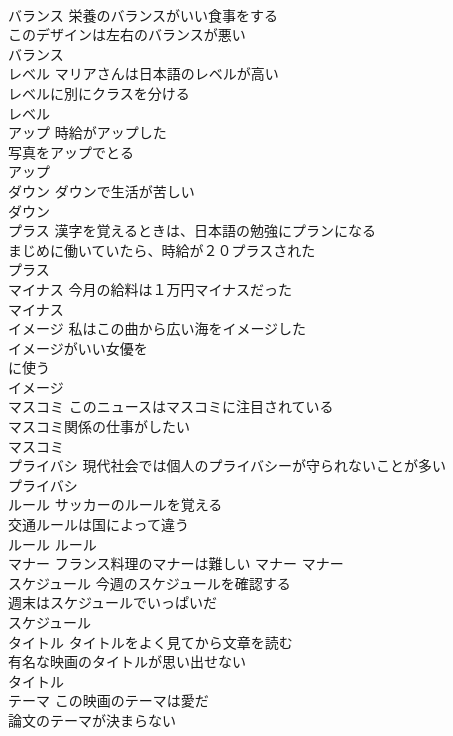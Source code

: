 \documentclass[8pt]{extreport}
\begin{document}
\begin{CJK}{UTF8}{min}
\\	バランス	栄養のバランスがいい食事をする 
\\	このデザインは左右のバランスが悪い 
\\	バランス						
\\	レベル	マリアさんは日本語のレベルが高い 
\\	レベルに別にクラスを分ける 
\\	レベル						
\\	アップ	時給がアップした 
\\	写真をアップでとる 
\\	アップ						
\\	ダウン	ダウンで生活が苦しい 
\\	ダウン						
\\	プラス	漢字を覚えるときは、日本語の勉強にプランになる 
\\	まじめに働いていたら、時給が２０プラスされた 
\\	プラス						
\\	マイナス	今月の給料は１万円マイナスだった 
\\	マイナス						
\\	イメージ	私はこの曲から広い海をイメージした 
\\	イメージがいい女優を
\\	に使う 
\\	イメージ						
\\	マスコミ	このニュースはマスコミに注目されている 
\\	マスコミ関係の仕事がしたい 
\\	マスコミ			
\\	プライバシ	現代社会では個人のプライバシーが守られないことが多い 
\\	プライバシ			
\\	ルール	サッカーのルールを覚える 
\\	交通ルールは国によって違う 
\\	ルール			ルール 
\\	マナー	フランス料理のマナーは難しい	マナー			マナー 
\\	スケジュール	今週のスケジュールを確認する 
\\	週末はスケジュールでいっぱいだ 
\\	スケジュール			
\\	タイトル	タイトルをよく見てから文章を読む 
\\	有名な映画のタイトルが思い出せない 
\\	タイトル			
\\	テーマ	この映画のテーマは愛だ 
\\	論文のテーマが決まらない 

\end{CJK}
\end{document}
